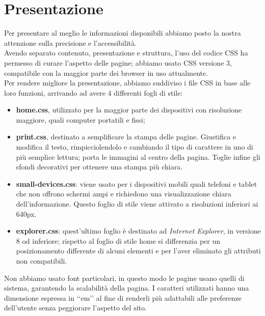 \section{Presentazione}{
	Per presentare al meglio le informazioni disponibili abbiamo posto la nostra attenzione sulla precisione e l'accessibilità.\\
	Avendo separato contenuto, presentazione e struttura, l'uso del codice CSS ha permesso di curare l'aspetto delle pagine; abbiamo usato CSS versione 3, compatibile con la maggior parte dei browser in uso attualmente.\\
	Per rendere migliore la presentazione, abbiamo suddiviso i file CSS in base alle loro funzioni, arrivando ad avere 4 differenti fogli di stile:
	\begin{itemize}
		\item \textbf{home.css}, utilizzato per la maggior parte dei dispositivi con risoluzione maggiore, quali computer portatili e fissi;
		\item \textbf{print.css}, destinato a semplificare la stampa delle pagine.
		Giustifica e modifica il testo, rimpicciolendolo e cambiando il tipo di carattere in uno di più semplice lettura; porta le immagini al centro della pagina. Toglie infine gli sfondi decorativi per ottenere una stampa più chiara.
		\item \textbf{small-devices.css}: viene usato per i dispositivi mobili quali telefoni e tablet che non offrono schermi ampi e richiedono una visualizzazione chiara dell'informazione. Questo foglio di stile viene attivato a risoluzioni inferiori ai 640px.
		\item \textbf{explorer.css}: quest'ultimo foglio è destinato ad \textit{Internet Explorer}, in versione 8 od inferiore; rispetto al foglio di stile home si differenzia per un posizionamento differente di alcuni elementi e per l'aver eliminato gli attributi non compatibili.
	\end{itemize}
	Non abbiamo usato font particolari, in questo modo le pagine usano quelli di sistema, garantendo la scalabilità della pagina. I caratteri utilizzati hanno una dimensione espressa in ‘‘em’’ al fine di renderli più adattabili alle preferenze dell'utente senza peggiorare l'aspetto del sito.
}
